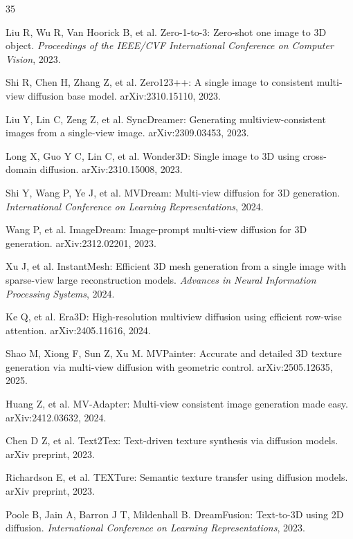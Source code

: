 \documentclass[times,twocolumn,final]{elsarticle}
\begin{document}
\begin{thebibliography}{35}

Liu R, Wu R, Van Hoorick B, et al. Zero-1-to-3: Zero-shot one image to 3D object. \textit{Proceedings of the IEEE/CVF International Conference on Computer Vision}, 2023.

Shi R, Chen H, Zhang Z, et al. Zero123++: A single image to consistent multi-view diffusion base model. arXiv:2310.15110, 2023.

Liu Y, Lin C, Zeng Z, et al. SyncDreamer: Generating multiview-consistent images from a single-view image. arXiv:2309.03453, 2023.

Long X, Guo Y C, Lin C, et al. Wonder3D: Single image to 3D using cross-domain diffusion. arXiv:2310.15008, 2023.

Shi Y, Wang P, Ye J, et al. MVDream: Multi-view diffusion for 3D generation. \textit{International Conference on Learning Representations}, 2024.

Wang P, et al. ImageDream: Image-prompt multi-view diffusion for 3D generation. arXiv:2312.02201, 2023.

Xu J, et al. InstantMesh: Efficient 3D mesh generation from a single image with sparse-view large reconstruction models. \textit{Advances in Neural Information Processing Systems}, 2024.

Ke Q, et al. Era3D: High-resolution multiview diffusion using efficient row-wise attention. arXiv:2405.11616, 2024.


Shao M, Xiong F, Sun Z, Xu M. MVPainter: Accurate and detailed 3D texture generation via multi-view diffusion with geometric control. arXiv:2505.12635, 2025.

Huang Z, et al. MV-Adapter: Multi-view consistent image generation made easy. arXiv:2412.03632, 2024.

Chen D Z, et al. Text2Tex: Text-driven texture synthesis via diffusion models. arXiv preprint, 2023.

Richardson E, et al. TEXTure: Semantic texture transfer using diffusion models. arXiv preprint, 2023.

Poole B, Jain A, Barron J T, Mildenhall B. DreamFusion: Text-to-3D using 2D diffusion. \textit{International Conference on Learning Representations}, 2023.


\end{thebibliography}
\end{document}
